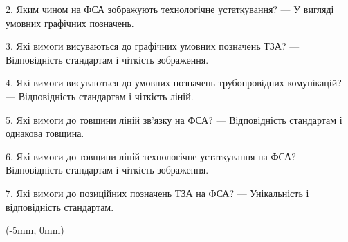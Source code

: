 \documentclass[a4paper]{article}
\begin{document}
2. Яким чином на ФСА зображують технологічне устаткування? — У вигляді умовних графічних позначень.  

3. Які вимоги висуваються до графічних умовних позначень ТЗА? — Відповідність стандартам і чіткість зображення.  

4. Які вимоги висуваються до умовних позначень трубопровідних комунікацій? — Відповідність стандартам і чіткість ліній.  

5. Які вимоги до товщини ліній зв’язку на ФСА? — Відповідність стандартам і однакова товщина.  

6. Які вимоги до товщини ліній технологічне устаткування на ФСА? — Відповідність стандартам і чіткість зображення.  

7. Які вимоги до позиційних позначень ТЗА на ФСА? — Унікальність і відповідність стандартам.  

\newpage
\fancyfoot[C]{}

\begin{textblock*}{\paperwidth}(-5mm, 0mm)
\end{textblock*}
\end{document}
